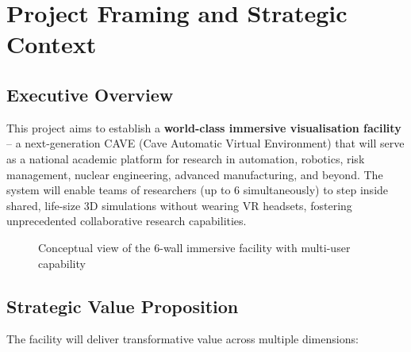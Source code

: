 \section{Project Framing and Strategic Context}

\subsection{Executive Overview}

This project aims to establish a \textbf{world-class immersive visualisation facility} – a next-generation CAVE (Cave Automatic Virtual Environment) that will serve as a national academic platform for research in automation, robotics, risk management, nuclear engineering, advanced manufacturing, and beyond. The system will enable teams of researchers (up to 6 simultaneously) to step inside shared, life-size 3D simulations without wearing VR headsets, fostering unprecedented collaborative research capabilities.

\begin{figure}[h]
\centering
{}
\caption{Conceptual view of the 6-wall immersive facility with multi-user capability}
\end{figure}

\subsection{Strategic Value Proposition}

The facility will deliver transformative value across multiple dimensions:

